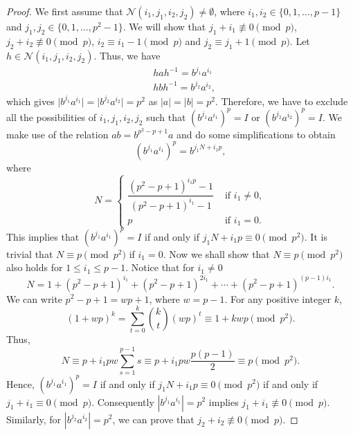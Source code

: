 \documentclass[10pt,a4paper]{amsart}
\begin{document}
\begin{proof}
We first assume that $\mathcal{N}(i_1,j_1,i_2,j_2) \neq \emptyset$, where $i_1,i_2 \in \{0,1,\ldots,p-1\}$ and $j_1,j_2 \in \{0,1,\ldots,p^{2}-1\}$. We will show that $ j_1+i_1 \not \equiv  0  \pmod  p$, $j_2+i_2 \not \equiv  0 \pmod  p$, $i_2\equiv i_1-1 \pmod  p$ and $j_2 \equiv j_1+1 \pmod  p$. Let $h \in \mathcal{N}(i_1,j_1,i_2,j_2)$. Thus, we have 
\begin{equation}\label{s41}
\begin{split}
&hah^{-1}=b^{j_1}a^{i_1}\\
&hbh^{-1}=b^{j_2}a^{i_2},
\end{split}
\end{equation}
which gives $\mid b^{j_1}a^{i_1}\mid =\mid b^{j_2}a^{i_2}\mid =p^2$ as $|a|=|b|=p^2$. Therefore, we have to exclude all the possibilities of $i_1,j_1,i_2,j_2$ such that $(b^{j_1}a^{i_1})^p=I$ or $(b^{j_2}a^{i_2})^p=I$. We make use of the relation $ab=b^{p^2-p+1}a$ and do some simplifications to obtain 
\[
(b^{j_1}a^{i_1})^p=b^{j_1N+i_1p},
\]
where 
$$
N=\begin{cases} \dfrac{(p^2-p+1)^{i_1p}-1}{(p^2-p+1)^{i_1}-1} & \text{ if } i_1 \neq 0,\\p 
 & \text{ if } i_1=0.\end{cases}$$
This implies that  $(b^{j_1}a^{i_1})^p=I$ if and only if $j_1N+i_1p \equiv 0 \pmod {p^2}$.
 It is trivial that $N \equiv p \pmod {p^2}$ if $i_1=0$. Now we shall show that $N \equiv p \pmod {p^2}$ also holds for $1 \leq i_1 \leq p-1$.  Notice that for $i_1 \neq 0$ 
\[
N=1+(p^2-p+1)^{i_1}+(p^2-p+1)^{2i_1}+\cdots+(p^2-p+1)^{(p-1)i_1}.
\]
We can write $p^2-p+1=wp+1$, where $w=p-1$. For any positive integer $k$, $$(1+wp)^k=\displaystyle \sum_{t=0}^{k}  \binom{k}{t} (wp)^t \equiv 1+kwp \pmod {p^2}.$$Thus, 
\[
N \equiv \displaystyle p+i_1pw\sum_{s=1}^{p-1}s \equiv p+i_1pw \frac{p(p-1)}{2} \equiv p \pmod {p^2}.
\]
 Hence,  $(b^{j_1}a^{i_1})^p=I$ if and only if $j_1N+i_1p \equiv 0 \pmod {p^2}$ if and only if $j_1+i_1 \equiv 0 \pmod p$. Consequently $|b^{j_1}a^{i_1}|=p^2$ implies $j_1+i_1 \not \equiv 0 \pmod  p$. Similarly, for $|b^{j_2}a^{i_2}|=p^2$, we can prove that $j_2+i_2 \not \equiv 0 \pmod  p$.


\end{proof}
\end{document}
